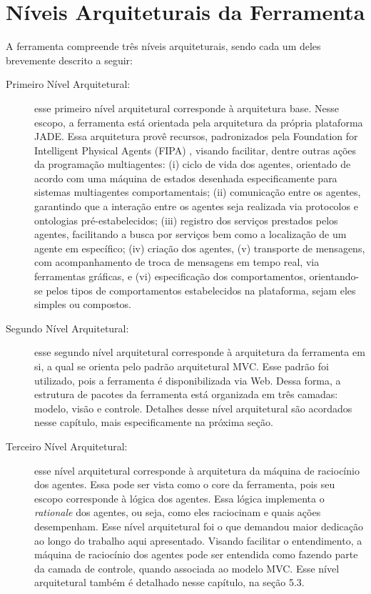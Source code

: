 \section{Níveis Arquiteturais da Ferramenta}
A ferramenta compreende três níveis arquiteturais, sendo cada um deles brevemente descrito a seguir:

\begin{description}
\item[Primeiro Nível Arquitetural:]
esse primeiro nível arquitetural corresponde à arquitetura base. Nesse escopo, a ferramenta está orientada pela arquitetura da própria plataforma JADE. Essa arquitetura provê recursos, padronizados pela Foundation for Intelligent Physical Agents (FIPA) \cite{telecon2014}, visando facilitar, dentre outras ações da programação multiagentes: (i) ciclo de vida dos agentes, orientado de acordo com uma máquina de estados desenhada especificamente para sistemas multiagentes comportamentais; (ii) comunicação entre os agentes, garantindo que a interação entre os agentes seja realizada via protocolos e ontologias pré-estabelecidos; (iii) registro dos serviços prestados pelos agentes, facilitando a busca por serviços bem como a localização de um agente em específico; (iv) criação dos agentes, (v) transporte de mensagens, com acompanhamento de troca de mensagens em tempo real, via ferramentas gráficas, e (vi) especificação dos comportamentos, orientando-se pelos tipos de comportamentos estabelecidos na plataforma, sejam eles simples ou compostos.

\item[Segundo Nível Arquitetural:]
esse segundo nível arquitetural corresponde à arquitetura da ferramenta em si, a qual se orienta pelo padrão arquitetural MVC. Esse padrão foi utilizado, pois a ferramenta é disponibilizada via Web. Dessa forma, a estrutura de pacotes da ferramenta está organizada em três camadas: modelo, visão e controle. Detalhes desse nível arquitetural são acordados nesse capítulo, mais especificamente na próxima seção.

\item[Terceiro Nível Arquitetural:]
esse nível arquitetural corresponde à arquitetura da máquina de raciocínio dos agentes. Essa pode ser vista como o core da ferramenta, pois seu escopo corresponde à lógica dos agentes. Essa lógica implementa o \textit{rationale} dos agentes, ou seja, como eles raciocinam e quais ações desempenham. Esse nível arquitetural foi o que demandou maior dedicação ao longo do trabalho aqui apresentado. Visando facilitar o entendimento, a máquina de raciocínio dos agentes pode ser entendida como fazendo parte da camada de controle, quando associada ao modelo MVC. Esse nível arquitetural também é detalhado nesse capítulo, na seção 5.3.

\end{description}


